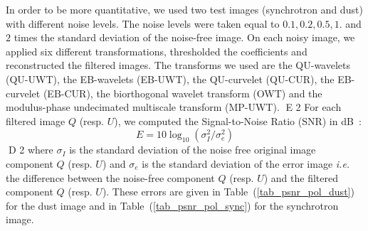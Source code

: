 In order to be more quantitative, we used two test images (synchrotron and dust) with different noise levels. 
The noise levels were taken equal to $0.1,0.2,0.5,1.$ and $2$ times the standard deviation of the noise-free image.
On each noisy image, we applied six different transformations, thresholded  the coefficients and reconstructed 
the filtered images. The transforms we used are the QU-wavelets (QU-UWT), the EB-wavelets (EB-UWT), the QU-curvelet (QU-CUR), 
the EB-curvelet (EB-CUR), the biorthogonal wavelet transform (OWT) and the modulus-phase undecimated multiscale transform (MP-UWT).
E 2
For each filtered image  $Q$  (resp. $U$), we computed the Signal-to-Noise Ratio (SNR) in dB~:
\begin{equation}
E  = 10 \log_{10}(  \sigma_I^2 /  \sigma_e^2 )
\end{equation}
D 2
where $\sigma_I$ is the standard deviation  of the noise free original image component $Q$ (resp. $U$) and $\sigma_e$ is the standard deviation of the error image \textit{i.e.} the difference between the noise-free component $Q$  (resp. $U$) and the filtered component  $Q$  (resp. $U$). These errors are given in Table~(\ref{tab_psnr_pol_dust}) for the dust image and in Table~(\ref{tab_psnr_pol_sync}) for the synchrotron image.

